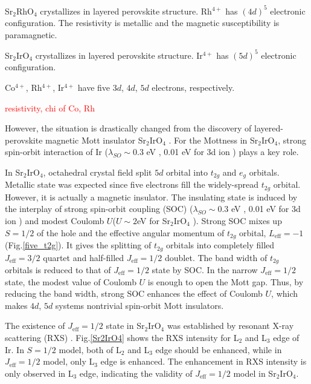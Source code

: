 Sr$_2$RhO$_4$ crystallizes in layered perovskite structure.
Rh$^{4+}$ has $(4d)^5$ electronic configuration.
The resistivity is metallic and the magnetic susceptibility is paramagnetic.


Sr$_2$IrO$_4$ crystallizes in layered perovskite structure.
Ir$^{4+}$ has $(5d)^5$ electronic configuration.

Co$^{4+}$, Rh$^{4+}$, Ir$^{4+}$ have five $3d$, $4d$, $5d$ electrons, respectively.

\textcolor{red}{resistivity, chi of Co, Rh}


However, the situation is drastically changed from the discovery of layered-perovskite magnetic Mott insulator Sr$_2$IrO$_4$ \cite{kim2008novel, kim2009phase}.
For the Mottness in Sr$_2$IrO$_4$, strong spin-orbit interaction of Ir ($\lambda_{SO} \sim 0.3$ eV \cite{kim2008novel}, 0.01 eV for 3d ion \cite{Kanamori}) plays a key role.

In Sr$_2$IrO$_4$, octahedral crystal field split $5d$ orbital into $t_{2g}$ and $e_g$ orbitals.
Metallic state was expected since five electrons fill the widely-spread $t_{2g}$ orbital.
However, it is actually a magnetic insulator.
The insulating state is induced by the interplay of strong spin-orbit coupling (SOC) ($\lambda_{SO} \sim 0.3$ eV \cite{kim2008novel}, 0.01 eV for 3d ion \cite{Kanamori})
and modest Coulomb $U$($U \sim 2$eV for Sr$_2$IrO$_4$ \cite{arita2012ab}).
Strong SOC mixes up $S = 1/2$ of the hole and the effective angular momentum of $t_{2g}$ orbital, $L_\mathrm{eff} = -1$ (Fig.\ref{five_t2g}).
It gives the splitting of $t_{2g}$ orbitals into completely filled $J_{\mathrm{eff}} = 3/2$ quartet and half-filled $J_{\mathrm{eff}} = 1/2$ doublet.
The band width of $t_{2g}$ orbitals is reduced to that of $J_{\mathrm{eff}} = 1/2$ state by SOC.
In the narrow $J_{\mathrm{eff}} = 1/2$ state, the modest value of Coulomb $U$ is enough to open the Mott gap.
Thus, by reducing the band width, strong SOC enhances the effect of Coulomb $U$, which makes $4d$, $5d$ systems nontrivial spin-orbit Mott insulators.

The existence of $J_{\mathrm{eff}} = 1/2$ state in Sr$_2$IrO$_4$ was established by resonant X-ray scattering (RXS) \cite{kim2009phase}.
Fig.\ref{Sr2IrO4} shows the RXS intensity for L$_2$ and L$_3$ edge of Ir.
In $S = 1/2$ model, both of L$_2$ and L$_3$ edge should be enhanced, while in $J_\mathrm{eff} = 1/2$ model, only L$_3$ edge is enhanced.
The enhancement in RXS intensity is only observed in L$_3$ edge, indicating the validity of $J_\mathrm{eff} = 1/2$ model in Sr$_2$IrO$_4$.

